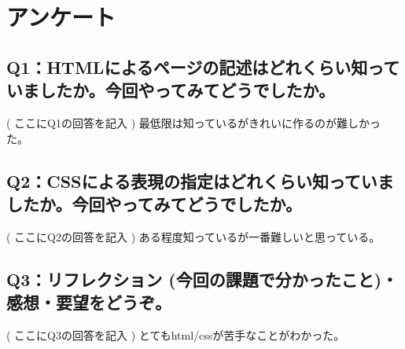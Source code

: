 \documentclass[12pt,a4j]{jarticle}
\begin{document}
\section{アンケート}

\subsection{Q1：HTMLによるページの記述はどれくらい知っていましたか。今回やってみてどうでしたか。}
( ここにQ1の回答を記入 )
最低限は知っているがきれいに作るのが難しかった。
\subsection{Q2：CSSによる表現の指定はどれくらい知っていましたか。今回やってみてどうでしたか。}
( ここにQ2の回答を記入 )
ある程度知っているが一番難しいと思っている。
\subsection{Q3：リフレクション (今回の課題で分かったこと)・感想・要望をどうぞ。}
( ここにQ3の回答を記入 )
とてもhtml/cssが苦手なことがわかった。
\end{document}

